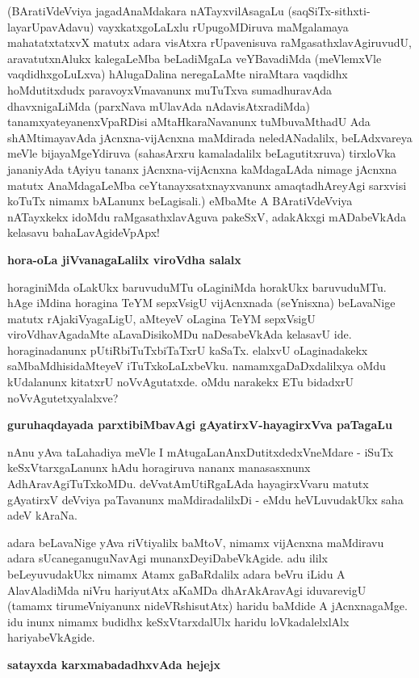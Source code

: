 \noindent
(BAratiVdeVviya jagadAnaMdakara nATayxvilAsagaLu (saqSiTx-sithxti-layarUpavAdavu) vayxkatxgoLaLxlu rUpugoMDiruva maMgalamaya mahatatxtatxvX matutx adara visAtxra rUpavenisuva raMgasathxlavAgiruvudU, aravatutxnAlukx kalegaLeMba beLadiMgaLa veYBavadiMda (meVlemxVle vaqdidhxgoLuLxva) hAlugaDalina neregaLaMte niraMtara vaqdidhx hoMdutitxdudx paravoyxVmavanunx muTuTxva sumadhuravAda dhavxnigaLiMda (parxNava mUlavAda nAdavisAtxradiMda) tanamxyateyanenxVpaRDisi aMtaHkaraNavanunx tuMbuvaMthadU Ada shAMtimayavAda jAcnxna-vijAcnxna maMdirada neledANadalilx, beLAdxvareya meVle bijayaMgeYdiruva (sahasArxru kamaladalilx beLagutitxruva) tirxloVka jananiyAda tAyiyu tananx jAcnxna-vijAcnxna kaMdagaLAda nimage jAcnxna matutx AnaMdagaLeMba ceYtanayxsatxnayxvanunx amaqtadhAreyAgi sarxvisi koTuTx nimamx bALanunx beLagisali.) eMbaMte A BAratiVdeVviya nATayxkekx idoMdu raMgasathxlavAguva pakeSxV, adakAkxgi mADabeVkAda kelasavu bahaLavAgideVpApx!

{\bigskip
\noindent
{\large\bf hora-oLa jiVvanagaLalilx viroVdha salalx}}\label{page201z}
\medskip

\noindent
horaginiMda oLakUkx baruvuduMTu oLaginiMda horakUkx baruvuduMTu. hAge iMdina horagina TeYM sepxVsigU vijAcnxnada (seYnisxna) beLavaNige matutx rAjakiVyagaLigU, aMteyeV oLagina TeYM sepxVsigU viroVdhavAgadaMte aLavaDisikoMDu naDesabeVkAda kelasavU ide. horaginadanunx pUtiRbiTuTxbiTaTxrU kaSaTx. elalxvU oLaginadakekx saMbaMdhisidaMteyeV iTuTxkoLaLxbeVku. namamxgaDaDxdalilxya oMdu kUdalanunx kitatxrU noVvAgutatxde. oMdu narakekx ETu bidadxrU noVvAgutetxyalalxve?

{\bigskip
\noindent
{\large\bf guruhaqdayada parxtibiMbavAgi gAyatirxV-hayagirxVva paTagaLu}}\label{page76}
\medskip

\noindent
nAnu yAva taLahadiya meVle I mAtugaLanAnxDutitxdedxVneMdare - iSuTx keSxVtarxgaLanunx hAdu horagiruva nananx manasasxnunx AdhAravAgiTuTxkoMDu. deVvatAmUtiRgaLAda hayagirxVvaru matutx gAyatirxV deVviya paTavanunx maMdiradalilxDi - eMdu heVLuvudakUkx saha adeV kAraNa.

adara beLavaNige yAva riVtiyalilx baMtoV, nimamx vijAcnxna maMdiravu adara sUcaneganuguNavAgi munanxDeyiDabeVkAgide. adu ililx beLeyuvudakUkx nimamx Atamx gaBaRdalilx adara beVru iLidu A AlavAladiMda niVru hariyutAtx aKaMDa dhArAkAravAgi iduvarevigU (tamamx tirumeVniyanunx nideVRshisutAtx) haridu baMdide A jAcnxnagaMge. idu inunx nimamx budidhx keSxVtarxdalUlx haridu loVkadalelxlAlx hariyabeVkAgide.

{\bigskip
\noindent
{\large\bf satayxda karxmabadadhxvAda hejejx}}\label{page76a}
\medskip

